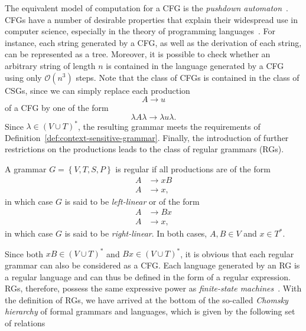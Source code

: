 The equivalent model of computation for a CFG is the \emph{pushdown automaton}~\cite{linz2006introduction}.  
CFGs have a number of desirable properties that explain their widespread use in computer science, especially in the theory of programming languages~\cite{pierce2002types}.
For instance, each string generated by a CFG, as well as the derivation of each string, can be represented as a tree.
Moreover, it is possible to check whether an arbitrary string of length $n$ is contained in the language generated by a CFG using only $\mathcal{O}(n^3)$ steps.
Note that the class of CFGs is contained in the class of CSGs, since we can simply replace each production 
\begin{equation*}
	A \to u
\end{equation*}
of a CFG by one of the form
\begin{equation*}
	\lambda A \lambda \to \lambda u \lambda.
\end{equation*} 
Since $\lambda \in \left(V \cup T\right)^*$, the resulting grammar meets the requirements of Definition~\ref{def:context-sensitive-grammar}.
Finally, the introduction of further restrictions on the productions leads to the class of regular grammars (RGs).
\begin{definition}
	A grammar $G = \left\{V, T, S, P\right\}$ is regular if all productions are of the form
	\begin{equation}
		\begin{split}
			A & \to xB \\
			A & \to x,
		\end{split}
	\end{equation}
in which case $G$ is said to be \emph{left-linear} or of the form
	\begin{equation}
	\begin{split}
		A & \to Bx \\
		A & \to x,
	\end{split}
	\end{equation}
in which case $G$ is said to be \emph{right-linear}. In both cases, $A, B \in V$ and $x \in T^*$.
\end{definition}
Since both $xB \in \left(V \cup T\right)^*$ and $Bx \in \left(V \cup T\right)^*$, it is obvious that each regular grammar can also be considered as a CFG.
Each language generated by an RG is a regular language and can thus be defined in the form of a regular expression. 
RGs, therefore, possess the same expressive power as \emph{finite-state machines}~\cite{linz2006introduction}.
With the definition of RGs, we have arrived at the bottom of the so-called \emph{Chomsky hierarchy} of formal grammars and languages, which is given by the following set of relations
